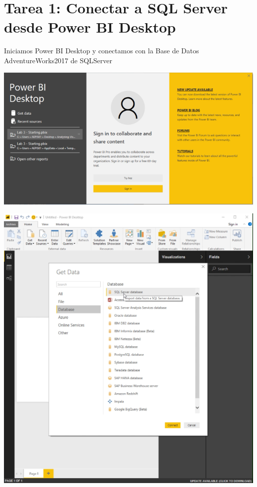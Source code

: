 \section{Tarea 1: Conectar a SQL Server desde Power BI Desktop } 

Iniciamos Power BI Desktop y conectamos con la Base de Datos AdventureWorks2017 de SQLServer

	\begin{center}
	\includegraphics[width=18cm]{./Imagenes/1}
	\end{center}	

	\begin{center}
	\includegraphics[width=17cm]{./Imagenes/2}
	\end{center}


